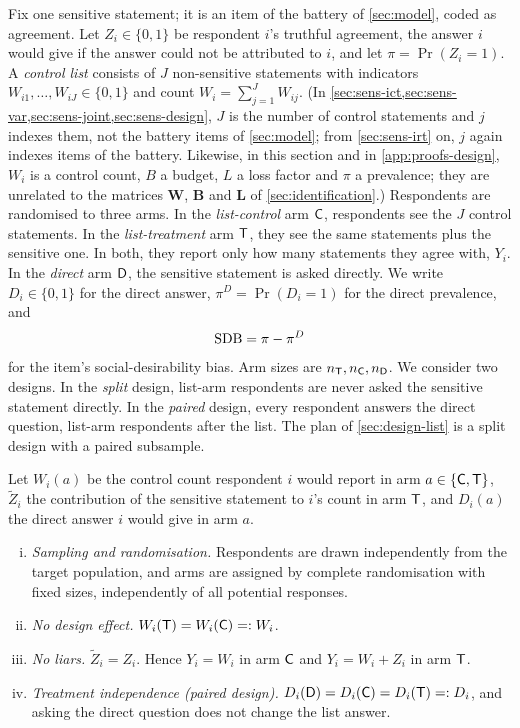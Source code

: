 Fix one sensitive statement; it is an item of the battery of \cref{sec:model}, coded as agreement. Let $Z_i\in\{0,1\}$ be respondent $i$'s truthful agreement, the answer $i$ would give if the answer could not be attributed to $i$, and let $\pi=\Pr(Z_i=1)$. A \emph{control list} consists of $J$ non-sensitive statements with indicators $W_{i1},\dots,W_{iJ}\in\{0,1\}$ and count $W_i=\sum_{j=1}^JW_{ij}$. (In \cref{sec:sens-ict,sec:sens-var,sec:sens-joint,sec:sens-design}, $J$ is the number of control statements and $j$ indexes them, not the battery items of \cref{sec:model}; from \cref{sec:sens-irt} on, $j$ again indexes items of the battery. Likewise, in this section and in \cref{app:proofs-design}, $W_i$ is a control count, $B$ a budget, $L$ a loss factor and $\pi$ a prevalence; they are unrelated to the matrices $\bm W$, $\bm B$ and $\bm L$ of \cref{sec:identification}.) Respondents are randomised to three arms. In the \emph{list-control} arm $\mathsf{C}$, respondents see the $J$ control statements. In the \emph{list-treatment} arm $\mathsf{T}$, they see the same statements plus the sensitive one. In both, they report only how many statements they agree with, $Y_i$. In the \emph{direct} arm $\mathsf{D}$, the sensitive statement is asked directly. We write $D_i\in\{0,1\}$ for the direct answer, $\pi^D=\Pr(D_i=1)$ for the direct prevalence, and
\[
  \mathrm{SDB}=\pi-\pi^D
\]
for the item's social-desirability bias. Arm sizes are $n_{\mathsf{T}},n_{\mathsf{C}},n_{\mathsf{D}}$. We consider two designs. In the \emph{split} design, list-arm respondents are never asked the sensitive statement directly. In the \emph{paired} design, every respondent answers the direct question, list-arm respondents after the list. The plan of \cref{sec:design-list} is a split design with a paired subsample.

\begin{assumption}\label{asm:le}
Let $W_i(a)$ be the control count respondent $i$ would report in arm $a\in\{\mathsf{C},\mathsf{T}\}$, $\tilde Z_i$ the contribution of the sensitive statement to $i$'s count in arm $\mathsf{T}$, and $D_i(a)$ the direct answer $i$ would give in arm $a$.
\begin{enumerate}[(i)]
  \item \emph{Sampling and randomisation.} Respondents are drawn independently from the target population, and arms are assigned by complete randomisation with fixed sizes, independently of all potential responses.
  \item \emph{No design effect.} $W_i(\mathsf{T})=W_i(\mathsf{C})=:W_i$.
  \item \emph{No liars.} $\tilde Z_i=Z_i$. Hence $Y_i=W_i$ in arm $\mathsf{C}$ and $Y_i=W_i+Z_i$ in arm $\mathsf{T}$.
  \item \emph{Treatment independence (paired design).} $D_i(\mathsf{D})=D_i(\mathsf{C})=D_i(\mathsf{T})=:D_i$, and asking the direct question does not change the list answer.
\end{enumerate}
\end{assumption}

